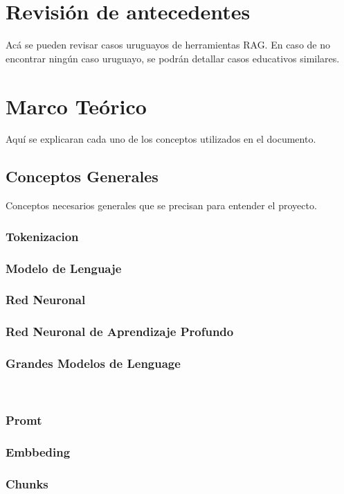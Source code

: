 \documentclass{../../prgrado}
\begin{document}
\chapter{Revisión de antecedentes}

Acá se pueden revisar casos uruguayos de herramientas RAG. 
En caso de no encontrar ningún caso uruguayo, se podrán detallar casos educativos similares.



\chapter{Marco Teórico}

Aquí se explicaran cada uno de los conceptos utilizados en el documento.

\section{Conceptos Generales}
Conceptos necesarios generales que se precisan para entender el proyecto.
\subsection{Tokenizacion}
\subsection{Modelo de Lenguaje}
\subsection{Red Neuronal}
\subsection{Red Neuronal de Aprendizaje Profundo}
\subsection{Grandes Modelos de Lenguage}
\
\subsection{Promt}
\subsection{Embbeding}
\subsection{Chunks}
\end{document}
